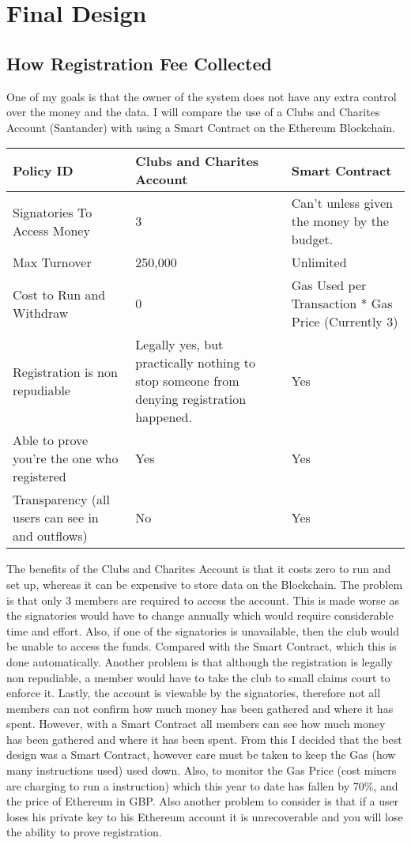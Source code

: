 \chapter{Final Design} \label{Chapter: Final Design}
\section{How Registration Fee Collected}
One of my goals is that the owner of the system does not have any extra control over the money and the data. I will compare the use of a Clubs and Charites Account (Santander) with using a Smart Contract on the Ethereum Blockchain. 
\begin{center}
 \begin{tabular}{|p{5cm}|p{5cm}|p{5cm}|}
 \hline
 Policy ID & Clubs and Charites Account & Smart Contract  \\
 \hline
 Signatories To Access Money & 3 &  Can’t unless given the money by the budget. \\
 \hline
 Max Turnover & 250,000 & Unlimited \\
 \hline
 Cost to Run and Withdraw & 0 & Gas Used per Transaction * Gas Price (Currently 3) \\
 \hline
 Registration is non repudiable & Legally yes, but practically nothing to stop someone from denying registration happened.  & Yes \\
 \hline
 Able to prove you’re the one who registered & Yes & Yes \\
 \hline
Transparency (all users can see in and outflows) & No & Yes \\
 \hline
\end{tabular}
\end{center}
The benefits of the Clubs and Charites Account is that it costs zero to run and set up, whereas it can be expensive to store data on the Blockchain. The problem is that only 3 members are required to access the account. This is made worse as the signatories would have to change annually which would require considerable time and effort. Also, if one of the signatories is unavailable, then the club would be unable to access the funds. Compared with the Smart Contract, which this is done automatically.  Another problem is that although the registration is legally non repudiable, a member would have to take the club to small claims court to enforce it. Lastly, the account is viewable by the signatories, therefore not all members can not confirm how much money has been gathered and where it has spent. However, with a Smart Contract all members can see how much money has been gathered and where it has been spent.
From this I decided that the best design was a Smart Contract, however care must be taken to keep the Gas (how many instructions used) used down. Also, to monitor the Gas Price (cost miners are charging to run a instruction) which this year to date has fallen by 70\%, and the price of Ethereum in GBP. Also another problem to consider is that if a user loses his private key to his Ethereum account it is unrecoverable and you will lose the ability to prove registration.
